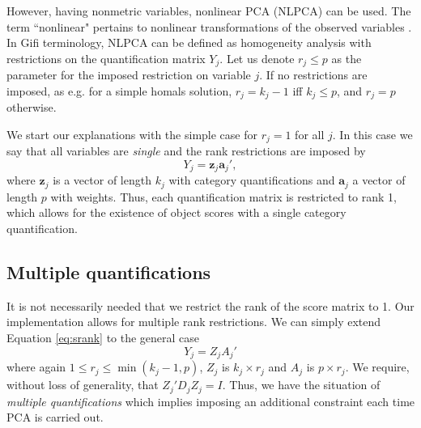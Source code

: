 \documentclass[article, nojss]{jss}
\begin{document}
However, having nonmetric variables, nonlinear PCA (NLPCA) can be used. The term ``nonlinear" pertains to nonlinear transformations of the observed variables \citep{deLeeuw:06}. In Gifi terminology, NLPCA can be defined as homogeneity analysis with restrictions on the quantification matrix $Y_j$. Let us denote $r_j \leq p$ as the parameter for the imposed restriction on variable $j$. If no restrictions are imposed, as e.g. for a simple homals solution, 
$r_j = k_j -1$ iff $k_j \leq p$, and $r_j = p$ otherwise. 

We start our explanations with the simple case for $r_j = 1$ for all $j$. In this case we say that all variables are \emph{single} and the rank restrictions are imposed by 
\begin{equation}
\label{eq:srank}
Y_j = \mathbf{z}_j\mathbf{a}_j',
\end{equation}
where $\mathbf{z}_j$ is a vector of length $k_j$ with category quantifications and $\mathbf{a}_j$ a vector of length $p$ with weights. Thus, each quantification matrix is restricted to rank 1, which allows for the existence of object scores with a single category quantification. 

\subsection{Multiple quantifications}
It is not necessarily needed that we restrict the rank of the score matrix to 1. Our  implementation allows for multiple rank restrictions. We can simply extend Equation \ref{eq:srank} to the general case 
\begin{equation}
\label{E:res}
Y_j=Z_jA_j'
\end{equation}
where again $1 \leq r_j \leq \min{(k_j-1,p)}$, $Z_j$ is $k_j \times r_j$ and $A_j$ is $p \times r_j$. We require, without loss of generality, that
$Z_j'D_j^{}Z_j^{}=I$. Thus, we have the situation of \emph{multiple quantifications} which implies imposing an additional constraint each time PCA is carried out. 
\end{document}
